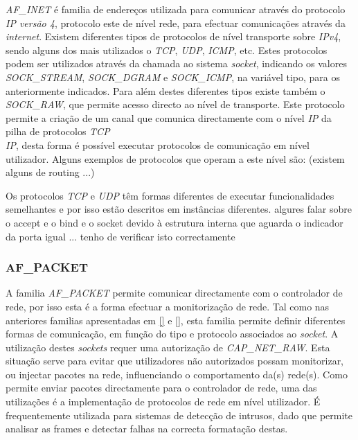 \textit{AF\_INET} é familia de endereços utilizada para comunicar através do protocolo \textit{IP versão 4}, protocolo este de nível rede, para efectuar comunicações através da \textit{internet}.
 Existem diferentes tipos de protocolos de nível transporte sobre \textit{IPv4}, sendo alguns dos mais utilizados o \textit{TCP}, \textit{UDP}, \textit{ICMP}, etc.
 Estes protocolos podem ser utilizados através da chamada ao sistema \textit{socket}, indicando os valores \textit{SOCK\_STREAM}, \textit{SOCK\_DGRAM} e \textit{SOCK\_ICMP}, na variável tipo, para os anteriormente indicados.
 Para além destes diferentes tipos existe também o \textit{SOCK\_RAW}, que permite acesso directo ao nível de transporte.
 Este protocolo permite a criação de um canal que comunica directamente com o nível \textit{IP} da pilha de protocolos \textit{TCP\\IP}, desta forma é possível executar protocolos de comunicação em nível utilizador.
 Alguns exemplos de protocolos que operam a este nível são: (existem alguns de routing ...)


Os protocolos \textit{TCP} e \textit{UDP} têm formas diferentes de executar funcionalidades semelhantes e por isso estão descritos em instâncias diferentes.
algures falar sobre o accept e o bind e o socket devido à estrutura interna que aguarda o indicador da porta igual ... tenho de verificar isto correctamente
\subsubsection{AF\_PACKET}
\label{subsub:af_packet}

A familia \textit{AF\_PACKET} permite comunicar directamente com o controlador de rede, por isso esta é a forma efectuar a monitorização de rede. 
 Tal como nas anteriores familias apresentadas em \ref{} e \ref{}, esta familia permite definir diferentes formas de comunicação, em função do tipo e protocolo associados ao \textit{socket}.
 A utilização destes \textit{sockets} requer uma autorização de \textit{CAP\_NET\_RAW}.
 Esta situação serve para evitar que utilizadores não autorizados possam monitorizar, ou injectar pacotes na rede, influenciando o comportamento da(s) rede(s).
 Como permite enviar pacotes directamente para o controlador de rede, uma das utilizações é a implementação de protocolos de rede em nível utilizador.
 É frequentemente utilizada para sistemas de detecção de intrusos, dado que permite analisar as frames e detectar falhas na correcta formatação destas.

